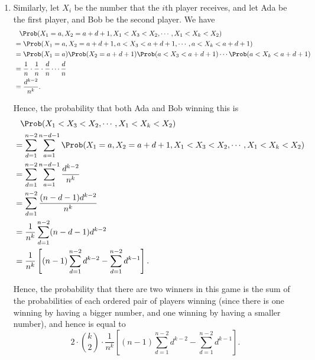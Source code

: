 \begin{enumerate}
    \item Similarly, let \(X_i\) be the number that the \(i\)th player receives, and let Ada be the first player, and Bob be the second player. We have
          \begin{align*}
               & \phantom{=} \Prob(X_1 = a, X_2 = a + d + 1, X_1 < X_3 < X_2, \cdots, X_1 < X_k < X_2)                \\
               & = \Prob(X_1 = a, X_2 = a + d + 1, a < X_3 < a + d + 1, \cdots, a < X_k < a + d + 1)                  \\
               & = \Prob(X_1 = a) \Prob(X_2 = a + d + 1) \Prob(a < X_3 < a + d + 1) \cdots \Prob(a < X_k < a + d + 1) \\
               & = \frac{1}{n} \cdot \frac{1}{n} \cdot \frac{d}{n} \cdots \frac{d}{n}                                 \\
               & = \frac{d^{k - 2}}{n^k}.
          \end{align*}

          Hence, the probability that both Ada and Bob winning this is
          \begin{align*}
               & \phantom{=} \Prob(X_1 < X_3 < X_2, \cdots, X_1 < X_k < X_2)                                                               \\
               & = \sum_{d = 1}^{n - 2} \sum_{a = 1}^{n - d - 1} \Prob(X_1 = a, X_2 = a + d + 1, X_1 < X_3 < X_2, \cdots, X_1 < X_k < X_2) \\
               & = \sum_{d = 1}^{n - 2} \sum_{a = 1}^{n - d - 1} \frac{d^{k - 2}}{n^k}                                                     \\
               & = \sum_{d = 1}^{n - 2} \frac{(n - d - 1) d^{k - 2}}{n^k}                                                                  \\
               & = \frac{1}{n^k} \sum_{d = 1}^{n - 2} (n - d - 1) d^{k - 2}                                                                \\
               & = \frac{1}{n^k} \left[(n - 1) \sum_{d = 1}^{n - 2} d^{k - 2} - \sum_{d = 1}^{n - 2} d^{k - 1}\right].
          \end{align*}

          Hence, the probability that there are two winners in this game is the sum of the probabilities of each ordered pair of players winning (since there is one winning by having a bigger number, and one winning by having a smaller number), and hence is equal to
          \[
              2 \cdot \binom{k}{2} \cdot \frac{1}{n^k} \left[(n - 1) \sum_{d = 1}^{n - 2} d^{k - 2} - \sum_{d = 1}^{n - 2} d^{k - 1}\right].
          \]


\end{enumerate}
